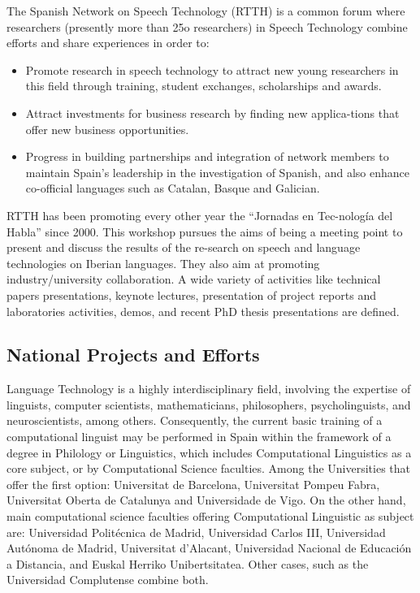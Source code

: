 \begin{multicols}{2}
\begin{itemize}
\begin{multicols}{2}
The Spanish Network on Speech Technology (RTTH) \cite{GAL-Nota34} is a common forum where researchers (presently more than 25o researchers) in Speech Technology combine efforts and share experiences in order to:
	\begin{itemize}
	\item Promote research in speech technology to attract new young researchers in this field through training, student exchanges, scholarships and awards.
	\item	 Attract investments for business research by finding new applica-tions that offer new business opportunities. 
	\item Progress in building partnerships and integration of network members to maintain Spain's leadership in the investigation of Spanish, and also enhance co-official languages such as Catalan, Basque and Galician.
    \end{itemize}
RTTH has been promoting every other year the “Jornadas en Tec-nología del Habla” since 2000. This workshop pursues the aims of being a meeting point to present and discuss the results of the re-search on speech and language technologies on Iberian languages. They also aim at promoting industry/university collaboration. A wide variety of activities like technical papers presentations, keynote lectures, presentation of project reports and laboratories activities, demos, and recent PhD thesis presentations are defined.

\subsection{National Projects and Efforts}

   Language Technology is a highly interdisciplinary field, involving the expertise of linguists, computer scientists, mathematicians, philosophers, psycholinguists, and neuroscientists, among others. Consequently, the current basic training of a computational linguist may be performed in Spain within the framework of a degree in Philology or Linguistics, which includes Computational Linguistics as a core subject, or by Computational Science faculties. Among the Universities that offer the first option: Universitat de Barcelona, Universitat Pompeu Fabra, Universitat Oberta de Catalunya and Universidade de Vigo. On the other hand, main computational science faculties offering Computational Linguistic as subject are: Universidad Politécnica de Madrid, Universidad Carlos III, Universidad Autónoma de Madrid, Universitat d’Alacant, Universidad Nacional de Educación a Distancia, and Euskal Herriko Unibertsitatea. Other cases, such as the Universidad Complutense combine both.


\end{multicols}
\end{itemize}
\end{multicols}
